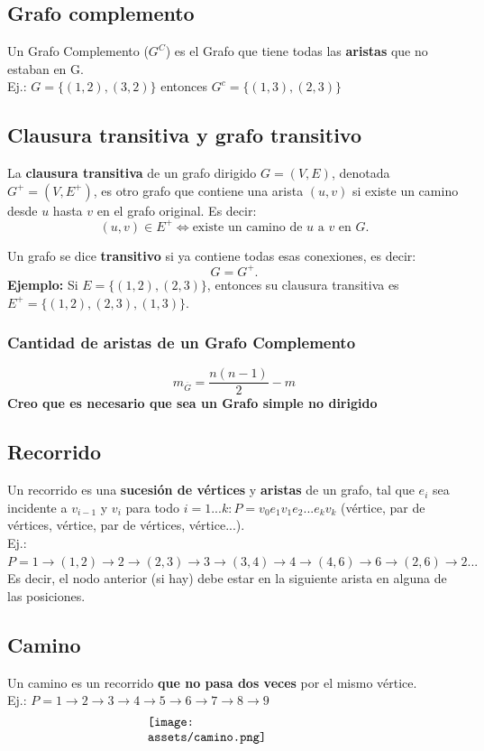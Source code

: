 \documentclass[10pt,a4paper]{article}
\begin{document}
\subsection*{Grafo complemento}
Un Grafo Complemento ($G^{C}$) es el Grafo que tiene todas las \textbf{aristas} que no estaban en G. \\
Ej.: $G = \{(1, 2), (3, 2)\}$ entonces $ G^{c} = \{(1, 3), (2, 3)\}$
\subsection*{Clausura transitiva y grafo transitivo}

La \textbf{clausura transitiva} de un grafo dirigido \(G = (V, E)\), denotada \(G^+ = (V, E^+)\), es otro grafo que contiene una arista \((u,v)\) si existe un camino desde \(u\) hasta \(v\) en el grafo original. Es decir:
\[
(u,v) \in E^+ \iff \text{existe un camino de } u \text{ a } v \text{ en } G.
\]

Un grafo se dice \textbf{transitivo} si ya contiene todas esas conexiones, es decir:
\[
G = G^+.
\]
\textbf{Ejemplo:} Si \(E = \{(1,2), (2,3)\}\), entonces su clausura transitiva es \(E^+ = \{(1,2), (2,3), (1,3)\}\).
\subsubsection*{Cantidad de aristas de un Grafo Complemento}
\[m_{\overline{G}} = \frac{n(n-1)}{2} - m\]
\textbf{Creo que es necesario que sea un Grafo simple no dirigido}
\subsection*{Recorrido}
Un recorrido es una \textbf{sucesión de vértices} y \textbf{aristas} de un grafo, tal que $e_{i}$ sea incidente a $v_{i-1}$ y $v_{i}$ para todo $i = 1...k : P = v_{0}e_{1}v_{1}e_{2}...e_{k}v_{k}$ (vértice, par de vértices, vértice, par de vértices, vértice...). \\
Ej.: $P = 1 \rightarrow (1,2) \rightarrow 2 \rightarrow (2,3) \rightarrow 3 \rightarrow (3,4) \rightarrow 4 \rightarrow (4,6) \rightarrow 6 \rightarrow (2,6) \rightarrow 2 ...$ \\
Es decir, el nodo anterior (si hay) debe estar en la siguiente arista en alguna de las posiciones.
\subsection*{Camino}
Un camino es un recorrido \textbf{que no pasa dos veces} por el mismo vértice. \\
Ej.: $P = 1 \rightarrow 2 \rightarrow 3 \rightarrow 4 \rightarrow 5 \rightarrow 6 \rightarrow 7 \rightarrow 8 \rightarrow 9$
\[\begin{minipage}[b]{0.4\textwidth}
    \texttt{[image: assets/camino.png]}
\end{minipage}\]
\end{document}
